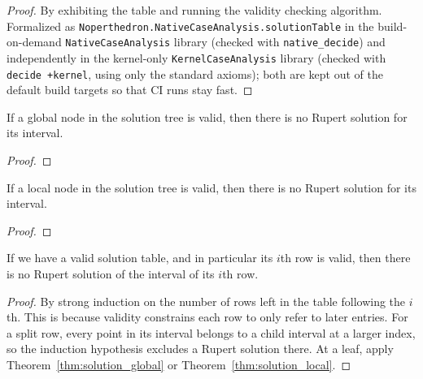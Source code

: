 \begin{proof}\leanok
{}
By exhibiting the table and running the validity checking algorithm.
Formalized as \texttt{Noperthedron.NativeCaseAnalysis.solutionTable}
in the build-on-demand \texttt{NativeCaseAnalysis} library (checked with
\texttt{native\_decide}) and independently in the kernel-only
\texttt{KernelCaseAnalysis} library (checked with \texttt{decide +kernel},
using only the standard axioms); both are kept out of the default build
targets so that CI runs stay fast.
\end{proof}

\begin{theorem}
\label{thm:solution_global}
If a global node in the solution tree is valid, then there is no Rupert solution for its interval.
\leanok
{}
\end{theorem}

\begin{proof}\leanok
{}
\end{proof}

\begin{theorem}
\label{thm:solution_local}
If a local node in the solution tree is valid, then there is no Rupert solution for its interval.
\leanok
{}
\end{theorem}

\begin{proof}\leanok
{}
\end{proof}


\begin{theorem}
\leanok
{}
\label{thm:row_valid_imp_not_rupert_ix}
If we have a valid solution table, and in particular its $i$th row is valid,
then there is no Rupert solution of the interval of its $i$th row.
\end{theorem}

\begin{proof}
\leanok
{}
By strong induction on the number of rows left in the table following the $i$th. This
is because validity constrains each row to only refer to later entries.
For a split row, every point in its interval belongs to a child interval at a
larger index, so the induction hypothesis excludes a Rupert solution there.
At a leaf, apply Theorem~\ref{thm:solution_global} or Theorem~\ref{thm:solution_local}.
\end{proof}

